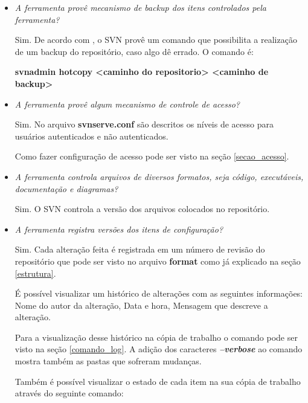 \begin{itemize}
  \item \textit{A ferramenta provê mecanismo de backup dos itens controlados pela ferramenta?}

    Sim. De acordo com , o SVN provê um comando que possibilita a realização de um backup do repositório, caso algo dê errado. O comando é:

    \begin{centering}
    \colorbox{PineGreen}{
    \begin{minipage}{420px}
      \textbf{svnadmin hotcopy <caminho do repositorio> <caminho de backup>}
    \end{minipage}
    }

    \end{centering} 

  \item \textit{A ferramenta provê algum mecanismo de controle de acesso?}
   
    Sim. No arquivo \textbf{svnserve.conf} são descritos os níveis de acesso para usuários autenticados e não autenticados.\cite{svn-book}

    Como fazer configuração de acesso pode ser visto na seção \ref{secao_acesso}.

  \item \textit{A ferramenta controla arquivos de diversos formatos, seja código, executáveis, documentação e diagramas?}
    
    Sim. O SVN controla a versão dos arquivos colocados no repositório.

  \item \textit{A ferramenta registra versões dos itens de configuração?}
   
    Sim. Cada alteração feita é registrada em um número de revisão do repositório que pode ser visto no arquivo \textbf{format} como já explicado na seção \ref{estrutura}.

    É possível visualizar um histórico de alterações com as seguintes informações: Nome do autor da alteração, Data e hora, Mensagem que descreve a alteração. \cite{svn-book}

    Para a visualização desse histórico na cópia de trabalho o comando pode ser visto na seção \ref{comando_log}. A adição dos caracteres \textbf{\textit{--verbose}} ao comando mostra também as pastas que sofreram mudanças. 

    Também é possível visualizar o estado de cada item na sua cópia de trabalho através do seguinte comando: \cite{svn-book}


\end{itemize}
